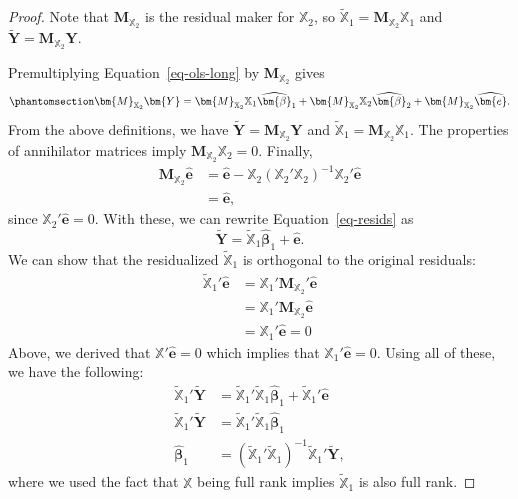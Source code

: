 \documentclass[
  13pt,
  letterpaper,
  DIV=11,
  numbers=noendperiod]{scrreprt}
\newcommand{\mb}{\bm}
\newcommand{\Xmat}{\mathbb{X}}
\newcommand{\bhat}{\widehat{\mb{\beta}}}
\theoremstyle{plain}
\theoremstyle{plain}
\theoremstyle{definition}
\theoremstyle{definition}
\theoremstyle{remark}
\begin{document}
\begin{proof}
Note that \(\mb{M}_{\Xmat_2}\) is the residual maker for \(\Xmat_2\), so
\(\widetilde{\Xmat}_1 = \mb{M}_{\Xmat_2}\Xmat_1\) and
\(\widetilde{\mb{Y}} = \mb{M}_{\Xmat_2}\mb{Y}\).

Premultiplying Equation~\ref{eq-ols-long} by \(\mb{M}_{\Xmat_2}\) gives
\begin{equation}\protect\phantomsection\label{eq-resids}{
\mb{M}_{\Xmat_2}\mb{Y} = \mb{M}_{\Xmat_2}\Xmat_{1}\bhat_{1} + \mb{M}_{\Xmat_2}\Xmat_{2}\bhat_{2} + \mb{M}_{\Xmat_2}\widehat{\mb{e}}.
}\end{equation} From the above definitions, we have
\(\widetilde{\mb{Y}} = \mb{M}_{\Xmat_2}\mb{Y}\) and
\(\widetilde{\Xmat}_1 = \mb{M}_{\Xmat_2}\Xmat_{1}\). The properties of
annihilator matrices imply \(\mb{M}_{\Xmat_2}\Xmat_{2} = 0\). Finally,
\[
\begin{aligned}
\mb{M}_{\Xmat_2}\widehat{\mb{e}} &=  \widehat{\mb{e}} - \Xmat_2(\Xmat_2'\Xmat_2)^{-1}\Xmat_2'\widehat{\mb{e}} \\
& = \widehat{\mb{e}},
\end{aligned}
\] since \(\Xmat_2'\widehat{\mb{e}} = 0\). With these, we can rewrite
Equation~\ref{eq-resids} as \[
\widetilde{\mb{Y}} = \widetilde{\Xmat}_1\bhat_{1} + \widehat{\mb{e}}.
\] We can show that the residualized \(\widetilde{\Xmat}_1\) is
orthogonal to the original residuals: \[
\begin{aligned}
\widetilde{\Xmat}_1'\widehat{\mb{e}} &= \Xmat_1'\mb M_{\Xmat_2}'\widehat{\mb{e}} \\
&= \Xmat_1'\mb M_{\Xmat_2}\widehat{\mb{e}} \\
&= \Xmat_1'\widehat{\mb{e}} = 0
\end{aligned}
\] Above, we derived that \(\Xmat'\widehat{\mb{e}} = 0\) which implies
that \(\Xmat_1'\widehat{\mb{e}} = 0\). Using all of these, we have the
following: \[
\begin{aligned}
\widetilde{\Xmat}_1'\widetilde{\mb{Y}} &= \widetilde{\Xmat}_1'\widetilde{\Xmat}_1\bhat_{1} + \widetilde{\Xmat}_1'\widehat{\mb{e}} \\ 
\widetilde{\Xmat}_1'\widetilde{\mb{Y}} &= \widetilde{\Xmat}_1'\widetilde{\Xmat}_1\bhat_{1} \\
\bhat_1 &= \left(\widetilde{\Xmat}_1'\widetilde{\Xmat}_1\right)^{-1}\widetilde{\Xmat}_1'\widetilde{\mb{Y}},
\end{aligned}
\] where we used the fact that \(\Xmat\) being full rank implies
\(\widetilde{\Xmat}_1\) is also full rank.
\end{proof}
\end{document}
